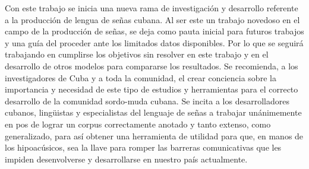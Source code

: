 \begin{recomendations}
    Con este trabajo se inicia una nueva rama de investigación y desarrollo referente a la producción de lengua de señas cubana.
    Al ser este un trabajo novedoso en el campo de la producción de señas, se deja como pauta inicial para futuros trabajos y una guía del proceder ante los limitados datos disponibles. Por lo que se seguirá trabajando en cumplirse los objetivos sin resolver en este trabajo y en el desarrollo de otros modelos para compararse los resultados.
   Se recomienda, a los investigadores de Cuba y a toda la comunidad, el crear conciencia sobre la importancia y necesidad de este tipo de estudios y herramientas para el correcto desarrollo de la comunidad sordo-muda cubana.
   Se incita a los desarrolladores cubanos, lingüistas y especialistas del lenguaje de señas a trabajar unánimemente en pos de lograr un corpus correctamente anotado y tanto extenso, como generalizado, para así obtener una herramienta de utilidad para que, en manos de los hipoacúsicos, sea la llave para romper las barreras comunicativas que les impiden desenvolverse y desarrollarse en nuestro país actualmente. 
\end{recomendations}
